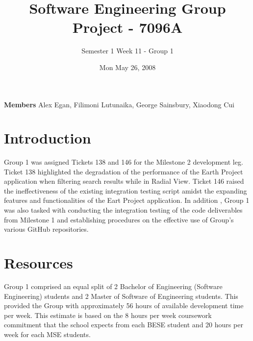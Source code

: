 \documentclass[oneside, 10pt, a4]{article}
\begin{document}
\title{Software Engineering Group Project - 7096A}
\author{Semester 1 Week 11 - Group 1}
\date{Mon May 26, 2008}

\maketitle

\noindent \textbf{Members} Alex Egan, Filimoni Lutunaika, George Sainsbury, Xiaodong Cui\\

\section{Introduction}

\paragraph{}
Group 1 was assigned Tickets 138 and 146 for the Milestone 2 development leg. 
Ticket 138 highlighted the degradation of the performance of the Earth Project 
application when filtering search results while in Radial View. Ticket 146 raised
 the ineffectiveness of the existing integration testing script amidst the expanding 
 features and functionalities of the Eart Project application. In addition , Group 1 was
  also tasked with conducting the integration testing of the code deliverables from Milestone 
  1 and establishing procedures on the effective use of Group's various GitHub repositories.

\paragraph{}

\section{Resources}
Group 1 comprised an equal split of 2 Bachelor of Engineering (Software Engineering)
 students and 2 Master of Software of Engineering students. This provided the Group with
  approximately 56 hours of available development time per week. This estimate is based on 
  the 8 hours per week coursework commitment that the school expects from each BESE student 
  and 20 hours per week for each MSE students.

\paragraph{}
\end{document}
